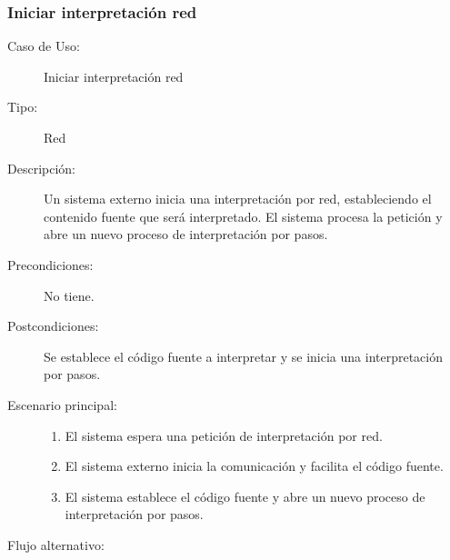 \subsubsection{Iniciar interpretación red} 

\begin{description}
   \item[Caso de Uso:]  Iniciar interpretación red 
   \item [Tipo:] Red
   \item[Descripción:] 
   Un sistema externo inicia una interpretación por red, estableciendo el contenido fuente que será interpretado.
   El sistema procesa la petición y abre un nuevo proceso de interpretación por pasos.
   \item[Precondiciones:] 
   No tiene. 
   \item[Postcondiciones:] 
   Se establece el código fuente a interpretar y se inicia una interpretación por pasos.
   \item[Escenario principal:] \hfill
   \begin{enumerate}
   \item El sistema espera una petición de interpretación por red.
   \item El sistema externo inicia la comunicación y facilita el código fuente.
   \item El sistema establece el código fuente y abre un nuevo proceso de interpretación por pasos. 
   \end{enumerate}
   \item[Flujo alternativo:] \hfill 
   \begin{enumerate} \itemsep1pt \parskip0pt 

\end{enumerate}
\end{description}
